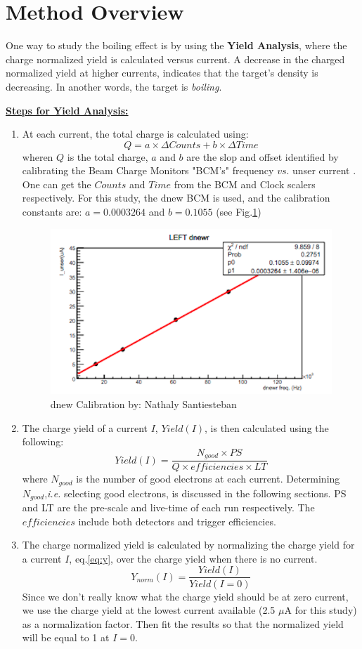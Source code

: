 \documentclass[preprint,12pt]{elsarticle}
\begin{document}
\section{Method Overview}
One way to study the boiling effect is by using the \textbf{Yield Analysis}, where the charge normalized yield is calculated versus current. A decrease in the charged normalized yield at higher currents, indicates that the target's density is decreasing. In another words, the target is \emph{boiling}. \par
\textbf{\underline{Steps for Yield Analysis:}}
\begin{enumerate}
\item{At each current, the total charge is calculated using:
\begin{equation}\label{eq:charge}
Q = a\times \Delta Counts + b\times \Delta Time
\end{equation}
wheren $Q$ is the total charge, $a$ and $b$ are the slop and offset identified by calibrating the Beam Charge Monitors "BCM's" frequency $vs.$ unser current . One can get the $Counts$ and $Time$ from the BCM and Clock scalers respectively. For this study, the dnew BCM is used, and the calibration constants are: $a=0.0003264$ and $b=0.1055$ (see Fig.\ref{fig:dnew})}
\begin{figure}[htb]
\centering
 \includegraphics[width=0.7\linewidth]{dnew.png}
  \caption{dnew Calibration by: Nathaly Santiesteban}
  \label{fig:dnew}
\end{figure}
\item{The charge yield of a current $I$, $Yield(I)$, is then calculated using the following:
\begin{equation}\label{eq:y}
Yield(I) = \frac{N_{good}\times PS}{Q\times efficiencies \times LT}
\end{equation}
where $N_{good}$ is the number of good electrons at each current. Determining $N_{good}$,\emph{i.e.} selecting good electrons, is discussed in the following sections. PS and LT are the pre-scale and live-time of each run respectively. The $efficiencies$ include both detectors and trigger efficiencies.}
\item{The charge normalized yield is calculated by normalizing the charge yield for a current $I$, eq.\ref{eq:y}, over the charge yield when there is no current.
\begin{equation}
Y_{norm}(I) = \frac{Yield(I)}{Yield(I=0)}
\end{equation}
Since we don't really know what the charge yield should be at zero current, we use the charge yield at the lowest current available (2.5 $\mu$A for this study) as a normalization factor. Then fit the results so that the normalized yield will be equal to 1 at $I=0$. 

}
\end{enumerate}
\end{document}
